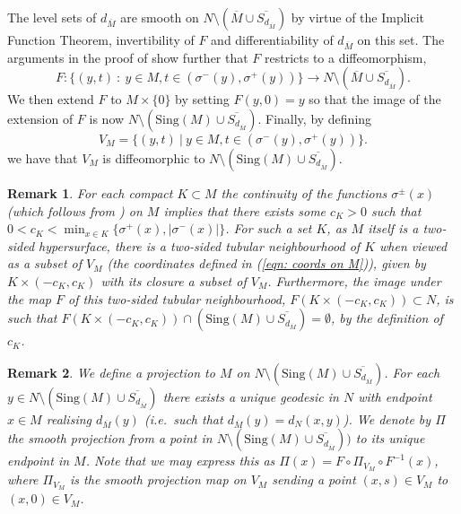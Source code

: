 \documentclass[11pt]{article}
\newtheorem{rem}{Remark}
\begin{document}
\bigskip
The level sets of $d_{\overline{M}}$ are smooth on $N \setminus (\overline{M} \cup \overline{S_{d_{\overline{M}}}})$ by virtue of the Implicit Function Theorem, invertibility of $F$ and differentiability of $d_{\overline{M}}$ on this set. The arguments in the proof of \cite[Proposition 4.6.]{mantegazza-mennucci} show further that $F$ restricts to a diffeomorphism,
\begin{equation*}
F : \{ (y, t) \: : \: y \in M,  t \in (\sigma^-(y),\sigma^+(y)) \} \rightarrow N \setminus (\overline{M} \cup \overline{S_{d_{\overline{M}}}}).
\end{equation*}
We then extend $F$ to $M \times \{0\}$ by setting $F(y,0) = y$ so that the image of the extension of $F$ is now $N \setminus (\mathrm{Sing}(M) \cup \overline{S_{d_{\overline{M}}}})$. Finally, by defining
\begin{equation}\label{eqn: coords on M}
    V_M = \{ (y,t) \: | \: y \in M, t \in \left(\sigma^-(y), \sigma^+(y)\right)\}. 
\end{equation}
we have that $V_M$ is diffeomorphic to $N \setminus (\mathrm{Sing}(M) \cup \overline{S_{d_{\overline{M}}}})$.

\begin{rem}\label{rem: two-sided neighbourhoods of compact subsets of M}
For each compact $K \subset M$ the continuity of the functions $\sigma^\pm (x)$ (which follows from \cite[Chapter III, Lemma 4.2]{sakai}) on $M$ implies that there exists some $c_K > 0$ such that $0 < c_K < \min_{x \in K}\{\sigma^+ (x), |\sigma^-(x)|\}$. For such a set $K$, as $M$ itself is a two-sided hypersurface, there is a two-sided tubular neighbourhood of $K$ when viewed as a subset of $V_M$ (the coordinates defined in (\ref{eqn: coords on M})), given by $K \times (-c_K,c_K)$ with its closure a subset of $V_M$. Furthermore, the image under the map $F$ of this two-sided tubular neighbourhood, $F(K \times (-c_K,c_K)) \subset N$, is such that $F(K \times (-c_K,c_K)) \cap (\mathrm{Sing}(M) \cup \overline{S_{d_{\overline{M}}}}) = \emptyset$, by the definition of $c_K$.
\end{rem}

\begin{rem}\label{rem: projection definition}
We define a projection to $M$ on $N \setminus (\mathrm{Sing}(M) \cup \overline{S_{d_{\overline{M}}}})$. For each $y \in N \setminus (\mathrm{Sing}(M) \cup \overline{S_{d_{\overline{M}}}})$ there exists a unique geodesic in $N$ with endpoint $x \in M$ realising $d_{\overline{M}}(y)$ (i.e.~such that $d_{\overline{M}}(y) = d_N(x,y)$). We denote by $\Pi$ the smooth projection from a point in $N \setminus (\mathrm{Sing}(M) \cup \overline{S_{d_{\overline{M}}}} ))$ to its unique endpoint in $M$. Note that we may express this as $\Pi(x) = F \circ \Pi_{V_M} \circ F^{-1}(x)$, where $\Pi_{V_M}$ is the smooth projection map on $V_M$ sending a point $(x,s) \in V_M$ to $(x,0) \in V_M$.
\end{rem}
\end{document}
